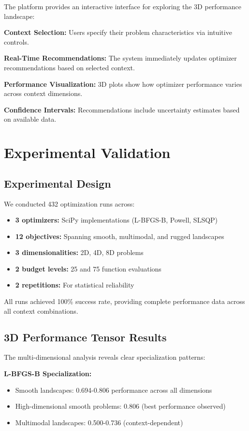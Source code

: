 \documentclass[article]{jss}
\begin{document}
The platform provides an interactive interface for exploring the 3D performance landscape:

\textbf{Context Selection:} Users specify their problem characteristics via intuitive controls.

\textbf{Real-Time Recommendations:} The system immediately updates optimizer recommendations based on selected context.

\textbf{Performance Visualization:} 3D plots show how optimizer performance varies across context dimensions.

\textbf{Confidence Intervals:} Recommendations include uncertainty estimates based on available data.

\section{Experimental Validation} \label{sec:results}

\subsection{Experimental Design}

We conducted 432 optimization runs across:
\begin{itemize}
\item \textbf{3 optimizers:} SciPy implementations (L-BFGS-B, Powell, SLSQP)
\item \textbf{12 objectives:} Spanning smooth, multimodal, and rugged landscapes
\item \textbf{3 dimensionalities:} 2D, 4D, 8D problems
\item \textbf{2 budget levels:} 25 and 75 function evaluations
\item \textbf{2 repetitions:} For statistical reliability
\end{itemize}

All runs achieved 100\% success rate, providing complete performance data across all context combinations.

\subsection{3D Performance Tensor Results}

The multi-dimensional analysis reveals clear specialization patterns:

\textbf{L-BFGS-B Specialization:}
\begin{itemize}
\item Smooth landscapes: 0.694-0.806 performance across all dimensions
\item High-dimensional smooth problems: 0.806 (best performance observed)
\item Multimodal landscapes: 0.500-0.736 (context-dependent)
\end{itemize}
\end{document}
